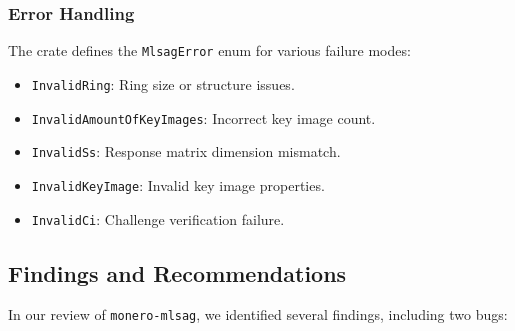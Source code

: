 \documentclass[12pt,a4paper]{article}
\begin{document}
\subsubsection{Error Handling}
\label{subsubsec:mlsag-errors}

The crate defines the \texttt{MlsagError} enum for various failure modes:
\begin{itemize}
  \item \texttt{InvalidRing}: Ring size or structure issues.
  \item \texttt{InvalidAmountOfKeyImages}: Incorrect key image count.
  \item \texttt{InvalidSs}: Response matrix dimension mismatch.
  \item \texttt{InvalidKeyImage}: Invalid key image properties.
  \item \texttt{InvalidCi}: Challenge verification failure.
\end{itemize}

\subsection{Findings and Recommendations}
\label{subsec:findings}

In our review of \texttt{monero-mlsag}, we identified several findings, including two bugs:
\end{document}
